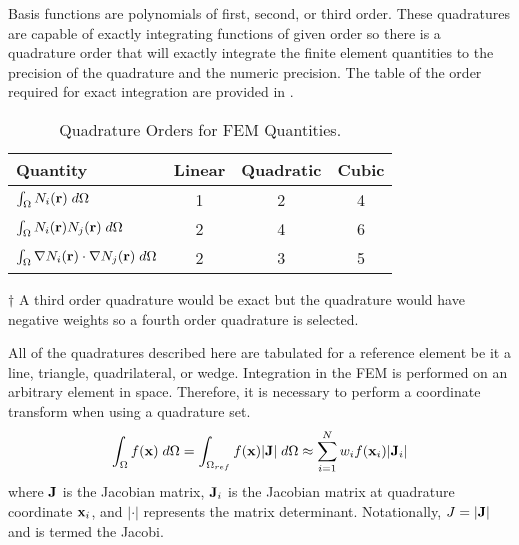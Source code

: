     Basis functions are polynomials of first, second, or third order. These 
    quadratures are capable of exactly integrating functions of given order so 
    there is a quadrature order that will exactly integrate the finite element 
    quantities to the precision of the quadrature and the numeric precision. The
    table of the order required for exact integration are provided in 
    .
    \begin{table}
      \begin{center}
        \caption{Quadrature Orders for FEM Quantities.}
        \label{tab:quadrature_orders}
        \begin{threeparttable}
          \begin{tabular}{lccc}
            \toprule
            Quantity & Linear & Quadratic & Cubic \\
            \midrule
            $\int_{\Omega} N_i(\mathbf{r}) \;d\Omega$ & 1 & 2 & 4
              \tnote{$\dagger$} \\
            $\int_{\Omega} N_i(\mathbf{r}) N_j(\mathbf{r}) \;d\Omega$ &
              2 & 4 & 6 \\
            $\int_{\Omega} \mathbf{\nabla} N_i(\mathbf{r}) \cdot \mathbf{\nabla} N_j(\mathbf{r}) 
              \;d\Omega$ & 2 & 3 & 5 \\
            \bottomrule
          \end{tabular}
          \begin{tablenotes}
            \item[$\dagger$] A third order quadrature would be exact but the 
              quadrature would have negative weights so a fourth order 
              quadrature is selected.
          \end{tablenotes}
        \end{threeparttable}
      \end{center}
    \end{table}
    
    All of the quadratures described here are tabulated for a reference element
    be it a line, triangle, quadrilateral, or wedge. Integration in the 
    FEM is performed on an arbitrary element in space. Therefore, it is 
    necessary to perform a coordinate transform when using a quadrature set.
    \begin{equation}
      \int_{\Omega} f(\mathbf{x}) \;d\Omega = 
        \int_{\Omega_{ref}} f(\mathbf{x}) \lvert \mathbf{J} \rvert \;d\Omega \approx
        \sum_{i=1}^{N} w_i f(\mathbf{x}_i) \lvert \mathbf{J}_i \rvert
    \end{equation}
    where $\mathbf{J}$ is the Jacobian matrix, $\mathbf{J}_i$ is the Jacobian matrix at 
    quadrature coordinate $\mathbf{x}_i$, and $\lvert \cdot \rvert$ represents
    the matrix determinant. Notationally, $J=\lvert \mathbf{J} \rvert$ and is termed
    the Jacobi.
    
